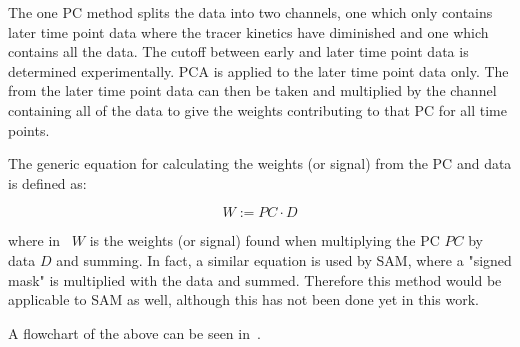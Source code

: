 \begin{itemize}
                        The one \gls{PC} method splits the data into two channels, one which only contains later time point data where the tracer kinetics have diminished and one which contains all the data. The cutoff between early and later time point data is determined experimentally. \gls{PCA} is applied to the later time point data only. The  from the later time point data can then be taken and multiplied by the channel containing all of the data to give the weights contributing to that \gls{PC} for all time points.
                        
                        The generic equation for calculating the weights (or signal) from the \gls{PC} and data is defined as:

                        \begin{equation} \label{eq:pca_data_driven_surrogate_signal_extraction_methods_for_dynamic_pet_methods_pc_weights}
                            W := PC \cdot D
                        \end{equation}
        
                        \noindent where in~ $W$ is the weights (or signal) found when multiplying the \gls{PC} $PC$ by data $D$ and summing. In fact, a similar equation is used by \gls{SAM}, where a "signed mask" is multiplied with the data and summed. Therefore this method would be applicable to SAM as well, although this has not been done yet in this work.
                    \end{itemize}
                    
                    A flowchart of the above can be seen in~.
                
